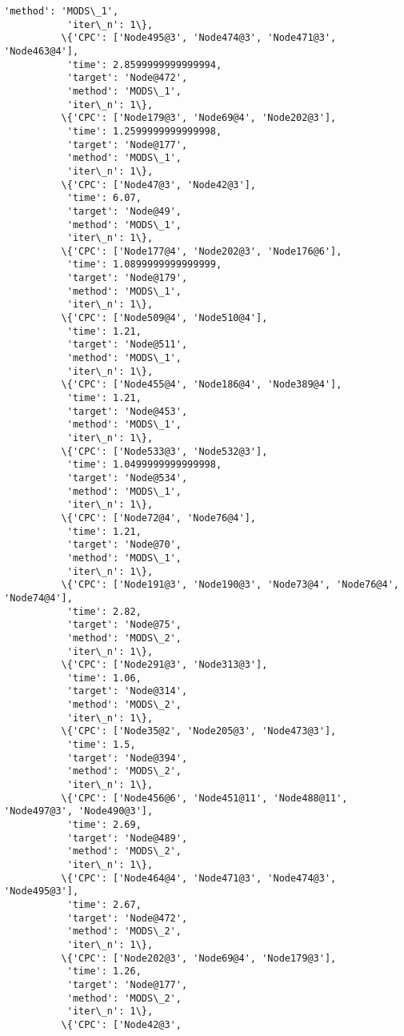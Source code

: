 \documentclass[11pt]{article}
\begin{document}
\begin{Verbatim}[commandchars=\\\{\}]
           'method': 'MODS\_1',
           'iter\_n': 1\},
          \{'CPC': ['Node495@3', 'Node474@3', 'Node471@3', 'Node463@4'],
           'time': 2.8599999999999994,
           'target': 'Node@472',
           'method': 'MODS\_1',
           'iter\_n': 1\},
          \{'CPC': ['Node179@3', 'Node69@4', 'Node202@3'],
           'time': 1.2599999999999998,
           'target': 'Node@177',
           'method': 'MODS\_1',
           'iter\_n': 1\},
          \{'CPC': ['Node47@3', 'Node42@3'],
           'time': 6.07,
           'target': 'Node@49',
           'method': 'MODS\_1',
           'iter\_n': 1\},
          \{'CPC': ['Node177@4', 'Node202@3', 'Node176@6'],
           'time': 1.0899999999999999,
           'target': 'Node@179',
           'method': 'MODS\_1',
           'iter\_n': 1\},
          \{'CPC': ['Node509@4', 'Node510@4'],
           'time': 1.21,
           'target': 'Node@511',
           'method': 'MODS\_1',
           'iter\_n': 1\},
          \{'CPC': ['Node455@4', 'Node186@4', 'Node389@4'],
           'time': 1.21,
           'target': 'Node@453',
           'method': 'MODS\_1',
           'iter\_n': 1\},
          \{'CPC': ['Node533@3', 'Node532@3'],
           'time': 1.0499999999999998,
           'target': 'Node@534',
           'method': 'MODS\_1',
           'iter\_n': 1\},
          \{'CPC': ['Node72@4', 'Node76@4'],
           'time': 1.21,
           'target': 'Node@70',
           'method': 'MODS\_1',
           'iter\_n': 1\},
          \{'CPC': ['Node191@3', 'Node190@3', 'Node73@4', 'Node76@4', 'Node74@4'],
           'time': 2.82,
           'target': 'Node@75',
           'method': 'MODS\_2',
           'iter\_n': 1\},
          \{'CPC': ['Node291@3', 'Node313@3'],
           'time': 1.06,
           'target': 'Node@314',
           'method': 'MODS\_2',
           'iter\_n': 1\},
          \{'CPC': ['Node35@2', 'Node205@3', 'Node473@3'],
           'time': 1.5,
           'target': 'Node@394',
           'method': 'MODS\_2',
           'iter\_n': 1\},
          \{'CPC': ['Node456@6', 'Node451@11', 'Node488@11', 'Node497@3', 'Node490@3'],
           'time': 2.69,
           'target': 'Node@489',
           'method': 'MODS\_2',
           'iter\_n': 1\},
          \{'CPC': ['Node464@4', 'Node471@3', 'Node474@3', 'Node495@3'],
           'time': 2.67,
           'target': 'Node@472',
           'method': 'MODS\_2',
           'iter\_n': 1\},
          \{'CPC': ['Node202@3', 'Node69@4', 'Node179@3'],
           'time': 1.26,
           'target': 'Node@177',
           'method': 'MODS\_2',
           'iter\_n': 1\},
          \{'CPC': ['Node42@3',

\end{Verbatim}
\end{document}
